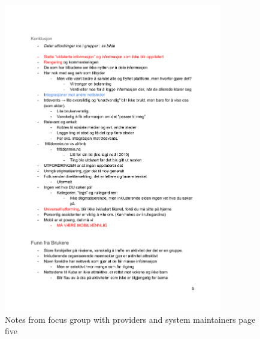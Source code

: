\begin{figure}[H]
\centering
    \includegraphics[width=0.85\textwidth]{fig/workshop/providers/WSTilbydere_5.pdf}
    \caption{Notes from focus group with providers and system maintainers page five}
    \label{Provider_5}
\end{figure}


